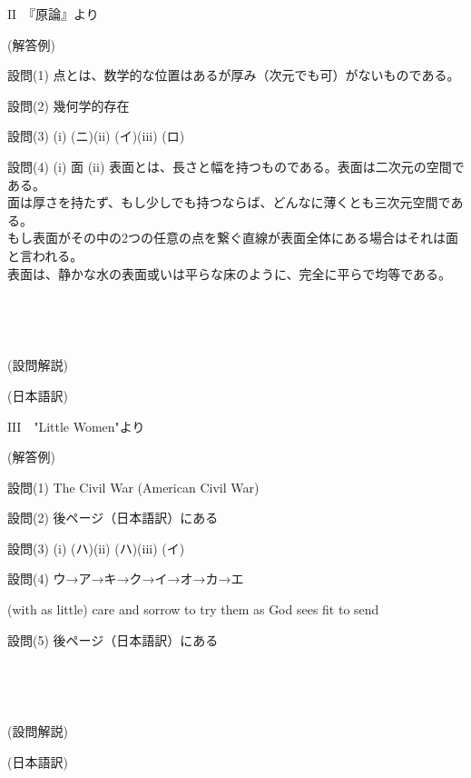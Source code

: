\documentclass[12pt,a4paper,dvipdfmx]{jarticle}
\begin{document}
\begin{spacing}{1.5}
\newpage

{\Large\textbf{$\mathrm{II}$}}　『原論』より
  
(解答例)

設問(1) 点とは、数学的な位置はあるが厚み（次元でも可）がないものである。

設問(2) 幾何学的存在

設問(3) (i) (ニ)\hspace{5mm}(ii) (イ)\hspace{5mm}(iii) (ロ)

設問(4)
(i) 面
(ii) 表面とは、長さと幅を持つものである。表面は二次元の空間である。\\
        面は厚さを持たず、もし少しでも持つならば、どんなに薄くとも三次元空間である。\\
        もし表面がその中の2つの任意の点を繋ぐ直線が表面全体にある場合はそれは面と言われる。\\
        表面は、静かな水の表面或いは平らな床のように、完全に平らで均等である。


\

\

(設問解説)


\newpage

(日本語訳)


\newpage

{\Large\textbf{$\mathrm{III}$}}　"Little Women"より

(解答例)

設問(1) The Civil War (American Civil War)

設問(2) 後ページ（日本語訳）にある

設問(3) (i) (ハ)\hspace{5mm}(ii) (ハ)\hspace{5mm}(iii) (イ)

設問(4) ウ→ア→キ→ク→イ→オ→カ→エ

(with as little) care and sorrow to try them as God sees fit to send

設問(5) 後ページ（日本語訳）にある

\

\

(設問解説)

\newpage

(日本語訳)





\end{spacing}
  
\end{document}
